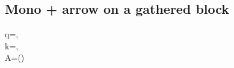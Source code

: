 \documentclass{article}
\begin{document}
\subsection*{Mono + arrow on a gathered block}
\begin{annotatedgather}
q=,\\
k=,\\
A=\!\left(\right)
\end{annotatedgather}
\end{document}
